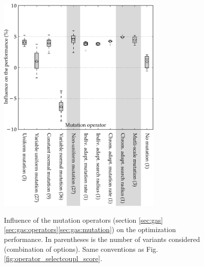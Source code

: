 \documentclass{ametsoc}
\begin{document}
\begin{figure}[t]
	\begin{center}
		\noindent\includegraphics[width=19pc,angle=0]{fig07.pdf}\\
	\end{center}
	\caption{Influence of the mutation operators (section \ref{sec:gas}\ref{sec:gas:operators}\ref{sec:gas:mutation}) on the optimization performance. In parentheses is the number of variants considered (combination of options). Same conventions as Fig. \ref{fig:operator_selectcoupl_score}.}
	\label{fig:operator_mutation_score}
\end{figure}
\end{document}
